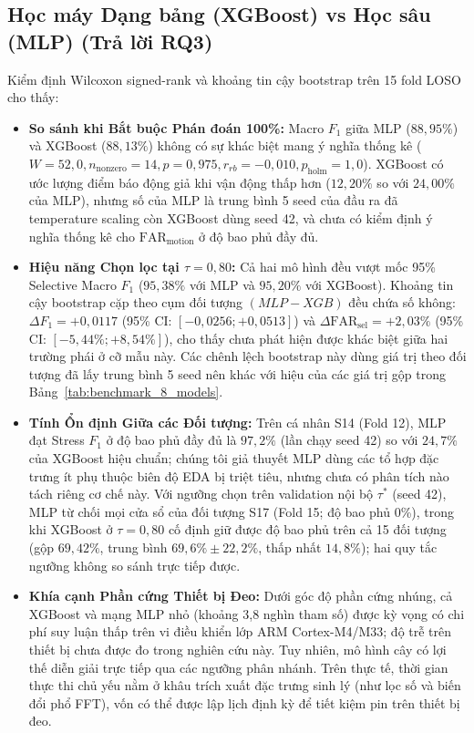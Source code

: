 \documentclass[conference]{IEEEtran}
\begin{document}
\subsection{Học máy Dạng bảng (XGBoost) vs Học sâu (MLP) (Trả lời RQ3)}
Kiểm định Wilcoxon signed-rank và khoảng tin cậy bootstrap trên 15 fold LOSO cho thấy:
\begin{itemize}
    \item \textbf{So sánh khi Bắt buộc Phán đoán 100\%:} Macro $F_1$ giữa MLP ($88,95\%$) và XGBoost ($88,13\%$) không có sự khác biệt mang ý nghĩa thống kê ($W = 52,0, n_{\text{nonzero}} = 14, p = 0,975, r_{rb} = -0,010, p_{\text{holm}} = 1,0$). XGBoost có ước lượng điểm báo động giả khi vận động thấp hơn ($12,20\%$ so với $24,00\%$ của MLP), nhưng số của MLP là trung bình 5 seed của đầu ra đã temperature scaling còn XGBoost dùng seed 42, và chưa có kiểm định ý nghĩa thống kê cho $\text{FAR}_{\text{motion}}$ ở độ bao phủ đầy đủ.
    \item \textbf{Hiệu năng Chọn lọc tại $\tau = 0,80$:} Cả hai mô hình đều vượt mốc 95\% Selective Macro $F_1$ ($95,38\%$ với MLP và $95,20\%$ với XGBoost). Khoảng tin cậy bootstrap cặp theo cụm đối tượng $(MLP - XGB)$ đều chứa số không: $\Delta F_1 = +0,0117$ (95\% CI: $[-0,0256; +0,0513]$) và $\Delta \text{FAR}_{\text{sel}} = +2,03\%$ (95\% CI: $[-5,44\%; +8,54\%]$), cho thấy chưa phát hiện được khác biệt giữa hai trường phái ở cỡ mẫu này. Các chênh lệch bootstrap này dùng giá trị theo đối tượng đã lấy trung bình 5 seed nên khác với hiệu của các giá trị gộp trong Bảng~\ref{tab:benchmark_8_models}.
    \item \textbf{Tính Ổn định Giữa các Đối tượng:} Trên cá nhân S14 (Fold 12), MLP đạt Stress $F_1$ ở độ bao phủ đầy đủ là $97,2\%$ (lần chạy seed 42) so với $24,7\%$ của XGBoost hiệu chuẩn; chúng tôi giả thuyết MLP dùng các tổ hợp đặc trưng ít phụ thuộc biên độ EDA bị triệt tiêu, nhưng chưa có phân tích nào tách riêng cơ chế này. Với ngưỡng chọn trên validation nội bộ $\tau^{*}$ (seed 42), MLP từ chối mọi cửa sổ của đối tượng S17 (Fold 15; độ bao phủ 0\%), trong khi XGBoost ở $\tau=0,80$ cố định giữ được độ bao phủ trên cả 15 đối tượng (gộp $69,42\%$, trung bình $69,6\% \pm 22,2\%$, thấp nhất $14,8\%$); hai quy tắc ngưỡng không so sánh trực tiếp được.
    \item \textbf{Khía cạnh Phần cứng Thiết bị Đeo:} Dưới góc độ phần cứng nhúng, cả XGBoost và mạng MLP nhỏ (khoảng 3,8 nghìn tham số) được kỳ vọng có chi phí suy luận thấp trên vi điều khiển lớp ARM Cortex-M4/M33; độ trễ trên thiết bị chưa được đo trong nghiên cứu này. Tuy nhiên, mô hình cây có lợi thế diễn giải trực tiếp qua các ngưỡng phân nhánh. Trên thực tế, thời gian thực thi chủ yếu nằm ở khâu trích xuất đặc trưng sinh lý (như lọc số và biến đổi phổ FFT), vốn có thể được lập lịch định kỳ để tiết kiệm pin trên thiết bị đeo.
\end{itemize}
\end{document}
